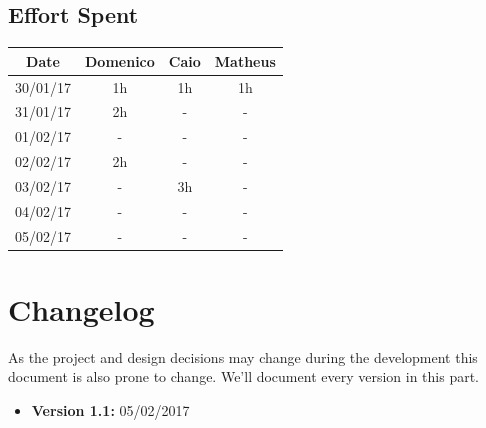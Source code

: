 \documentclass[a4paper]{article}
\begin{document}
\subsection{Effort Spent}
\begin{tabular}{ | c | c | c | c | }
\hline
	\textbf {Date} & \textbf {Domenico} & \textbf {Caio} & \textbf {Matheus} \\ \hline
	30/01/17& 1h & 1h & 1h  \\ \hline
	31/01/17& 2h & - & -  \\ \hline
	01/02/17& - & - & -  \\ \hline
	02/02/17& 2h & - & -  \\ \hline
	03/02/17& - & 3h& -  \\ \hline
	04/02/17& - & - & -  \\ \hline
	05/02/17& - & - & -  \\ \hline

\end{tabular}
\newpage

\section{Changelog}
As the project and design decisions may change during the development this document is also prone to change.
We'll document every version in this part.
\begin{itemize}
\item \textbf {Version 1.1:} 05/02/2017
\end{itemize}
\end{document}
